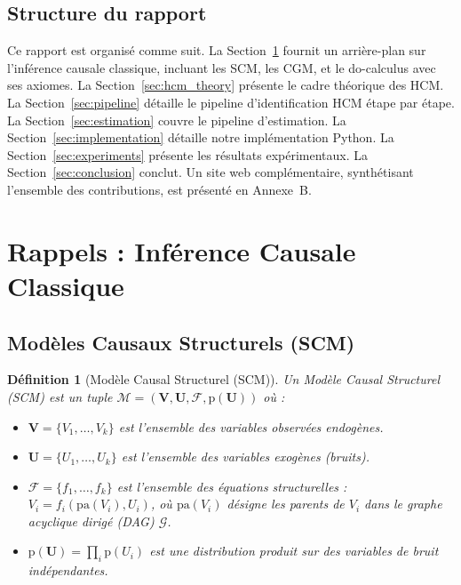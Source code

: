 \documentclass[11pt,a4paper]{article}
\newcommand{\pa}{\mathrm{pa}}
\newcommand{\pr}{\mathrm{p}}
\newcommand{\Mc}{\mathcal{M}}
\newtheorem{definition}{Définition}
\begin{document}
\subsection{Structure du rapport}

Ce rapport est organisé comme suit.
La Section~\ref{sec:background} fournit un arrière-plan sur l'inférence causale classique, incluant les SCM, les CGM, et le do-calculus avec ses axiomes.
La Section~\ref{sec:hcm_theory} présente le cadre théorique des HCM.
La Section~\ref{sec:pipeline} détaille le pipeline d'identification HCM étape par étape.
La Section~\ref{sec:estimation} couvre le pipeline d'estimation.
La Section~\ref{sec:implementation} détaille notre implémentation Python.
La Section~\ref{sec:experiments} présente les résultats expérimentaux.
La Section~\ref{sec:conclusion} conclut.
Un site web complémentaire, synthétisant l'ensemble des contributions, est présenté en Annexe~B.

\section{Rappels : Inférence Causale Classique}
\label{sec:background}

\subsection{Modèles Causaux Structurels (SCM)}

\begin{definition}[Modèle Causal Structurel (SCM)]
Un Modèle Causal Structurel (SCM) est un tuple $\Mc = (\mathbf{V}, \mathbf{U}, \mathcal{F}, \pr(\mathbf{U}))$ où :
\begin{itemize}
  \item $\mathbf{V} = \{V_1, \ldots, V_k\}$ est l'ensemble des variables observées endogènes.
  \item $\mathbf{U} = \{U_1, \ldots, U_k\}$ est l'ensemble des variables exogènes (bruits).
  \item $\mathcal{F} = \{f_1, \ldots, f_k\}$ est l'ensemble des équations structurelles : $V_i = f_i(\pa(V_i), U_i)$, où $\pa(V_i)$ désigne les parents de $V_i$ dans le graphe acyclique dirigé (DAG) $\mathcal{G}$.
  \item $\pr(\mathbf{U}) = \prod_i \pr(U_i)$ est une distribution produit sur des variables de bruit indépendantes.
\end{itemize}
\end{definition}
\end{document}

